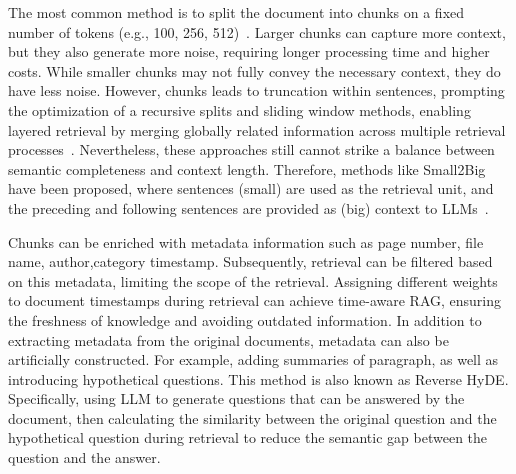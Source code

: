 The most common method is to split the document into chunks on a fixed number of tokens (e.g., 100, 256, 512)~. Larger chunks can capture more context, but they also generate more noise, requiring longer processing time and higher costs. While smaller chunks may not fully convey the necessary context, they do have less noise. However, chunks leads to truncation within sentences, prompting the optimization of a recursive splits and sliding window  methods, enabling layered retrieval by merging globally related information across multiple retrieval processes~. Nevertheless, these approaches still cannot strike a balance between semantic completeness and  context length. Therefore, methods like Small2Big have been proposed, where sentences (small) are used as the retrieval unit, and the preceding and following sentences are provided as (big) context to LLMs~.

Chunks can be enriched with metadata information such as page number, file name, author,category timestamp. Subsequently, retrieval can be filtered based on this metadata, limiting the scope of the retrieval. Assigning different weights to document timestamps during retrieval can achieve time-aware RAG, ensuring the freshness of knowledge and avoiding outdated information.
In addition to extracting metadata from the original documents, metadata can also be artificially constructed. For example, adding summaries of paragraph, as well as introducing hypothetical questions. This method is also known as Reverse HyDE. Specifically, using LLM to generate questions that can be answered by the document, then calculating the similarity between the original question and the hypothetical question during retrieval to reduce the semantic gap between the question and the answer.

